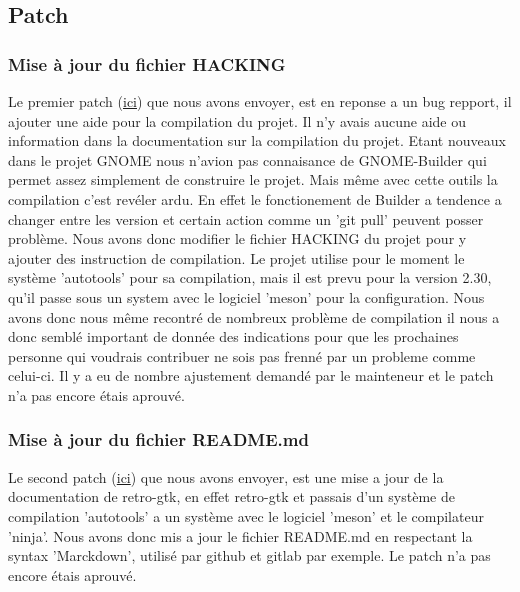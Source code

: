 \documentclass[12pt]{report}
\begin{document}
\subsection{Patch}
\subsubsection{Mise à jour du fichier HACKING}
Le premier patch (\href{http://bugzilla.gnome.org/show_bug.cgi?id=788692}{ici}) 
que nous avons envoyer, est en reponse a un bug repport, il ajouter une 
aide pour la compilation du projet. \newline
Il n'y avais aucune aide ou information dans la documentation sur la compilation
du projet. Etant nouveaux dans le projet GNOME nous n'avion pas connaisance de 
GNOME-Builder qui permet assez simplement de construire le projet. Mais
même avec cette outils la compilation c'est revéler ardu. En effet 
le fonctionement de Builder a tendence a changer entre les version et certain
action comme un 'git pull' peuvent posser problème.
Nous avons donc modifier le fichier HACKING du projet pour y ajouter des 
instruction de compilation. Le projet utilise pour le moment le système 
'autotools' pour sa compilation, mais il est prevu pour la version 2.30, 
qu'il passe sous un system avec le logiciel 'meson' pour la configuration. 
\newline
Nous avons donc nous même recontré de nombreux problème de compilation 
il nous a donc semblé important de donnée des indications pour que les 
prochaines personne qui voudrais contribuer ne sois pas frenné par un 
probleme comme celui-ci.
Il y a eu de nombre ajustement demandé par le mainteneur et le patch n'a 
pas encore étais aprouvé. \newline

\subsubsection{Mise à jour du fichier README.md}
Le second patch (\href{http://bugzilla.gnome.org/show_bug.cgi?id=790454}{ici}) 
que nous avons envoyer, est une mise a jour de la documentation de retro-gtk, 
en effet retro-gtk et passais d'un système de compilation 'autotools' a un
système avec le logiciel 'meson' et le compilateur 'ninja'.
Nous avons donc mis a jour le fichier README.md en respectant la syntax
'Marckdown', utilisé par github et gitlab par exemple.
Le patch n'a pas encore étais aprouvé. \newline
\end{document}
